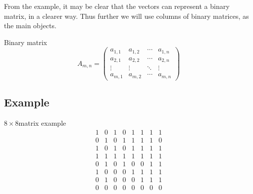 \documentclass{beamer}
\begin{document}
\begin{frame}
  From the example, it may be clear that the vectors can represent a
  \alert{binary matrix}, in a clearer way. Thus further we will use columns of binary
  matrices, as the main objects.

  \begin{block}{Binary matrix}
    \[
      A_{m,n} =
      \begin{pmatrix}
        a_{1,1} & a_{1,2} & \cdots & a_{1,n} \\
        a_{2,1} & a_{2,2} & \cdots & a_{2,n} \\
        \vdots  & \vdots  & \ddots & \vdots  \\
        a_{m,1} & a_{m,2} & \cdots & a_{m,n}
      \end{pmatrix}
    \]
  \end{block}
\end{frame}

\subsection{Example}

\begin{frame}
  \begin{block}{$8 \times 8$matrix example}
    \[
      \begin{matrix}
        1 & 0 & 1 & 0 & 1 & 1 & 1 & 1 \\
        0 & 1 & 0 & 1 & 1 & 1 & 1 & 0 \\
        1 & 0 & 1 & 0 & 1 & 1 & 1 & 1 \\
        1 & 1 & 1 & 1 & 1 & 1 & 1 & 1 \\
        0 & 1 & 0 & 1 & 0 & 0 & 1 & 1 \\
        1 & 0 & 0 & 0 & 1 & 1 & 1 & 1 \\
        0 & 1 & 0 & 0 & 0 & 1 & 1 & 1 \\
        0 & 0 & 0 & 0 & 0 & 0 & 0 & 0
      \end{matrix}
    \]
  \end{block}
\end{frame}
\end{document}
